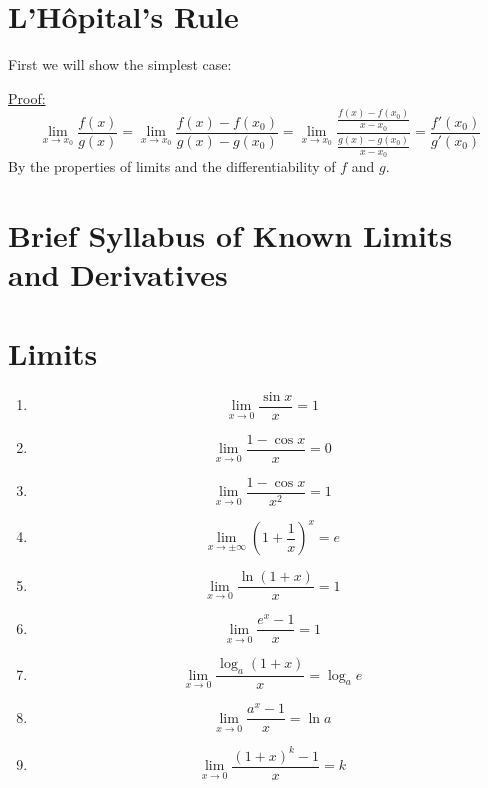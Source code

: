 \documentclass{book}
\newtheorem{theorem}{Theorem}[section]
\begin{document}
\section{L'Hôpital's Rule}
First we will show the simplest case:
\begin{tcolorbox}[width=\textwidth,colback={mygray},title={\begin{theorem} $f,g$ differentiable on an open interval $I$ with $x_0\in I$. Suppose $f(x_0)=g(x_0)=0$ and that $g'(x_0)\neq 0$. Then $$\lim_{x\rightarrow x_0}\frac{f(x)}{g(x)}=\frac{f'(x_0)}{g'(x_0)}$$\end{theorem}},colbacktitle=myblue,coltitle=black]    
\underline{Proof:}\\  $$\lim_{x\rightarrow x_0}\frac{f(x)}{g(x)}=\lim_{x\rightarrow x_0}\frac{f(x)-f(x_0)}{g(x)-g(x_0)}=\lim_{x\rightarrow x_0}\displaystyle\frac{\displaystyle\frac{f(x)-f(x_0)}{x-x_0}}{\displaystyle\frac{g(x)-g(x_0)}{x-x_0}}= \frac{f'(x_0)}{g'(x_0)}  $$
By the properties of limits and the differentiability of $f$ and $g$.
\end{tcolorbox}


\newpage

\section{Brief Syllabus of Known Limits and Derivatives}

\newcommand{\limt}{\lim_{x \to 0}}
\newcommand{\lims}{\lim_{x \to x_0}}
\newcommand{\fr}{\frac{d}{dx}}

\section*{Limits}

\begin{enumerate}

    \item $$ \limt \frac{\sin x}{x}=1$$
    \item $$ \limt \frac{1-\cos x}{x}= 0$$
    \item $$ \limt \frac{1- \cos x}{x^2}=1$$
    \item $$ \lim_{x \to \pm \infty} \left( 1+\frac{1}{x} \right)^x=e$$
    \item $$ \limt \frac{\ln (1+x)}{x}=1$$
    \item $$ \limt \frac{e^x-1}{x}=1$$
    \item $$ \limt \frac{\log_a(1+x)}{x}= \log_a e$$
    \item $$ \limt \frac{a^x-1}{x}=\ln a$$
    \item $$ \limt \frac{(1+x)^k-1}{x}=k$$
    
\end{enumerate}
\end{document}
